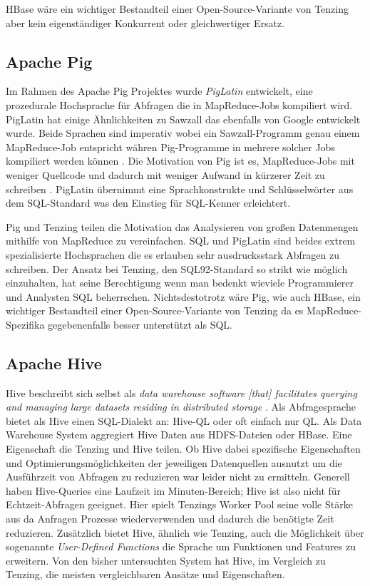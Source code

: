\documentclass[a4paper]{article}
\begin{document}
HBase wäre ein wichtiger Bestandteil einer Open-Source-Variante von Tenzing aber kein eigenständiger Konkurrent oder gleichwertiger Ersatz.

\subsection{Apache Pig}
Im Rahmen des Apache Pig Projektes wurde \textit{PigLatin} entwickelt, eine prozedurale Hochsprache für Abfragen die in MapReduce-Jobs kompiliert wird. PigLatin hat einige Ähnlichkeiten zu Sawzall \cite{Sawzall} das ebenfalls von Google entwickelt wurde. Beide Sprachen sind imperativ wobei ein Sawzall-Programm genau einem MapReduce-Job entspricht währen Pig-Programme in mehrere solcher Jobs kompiliert werden können \cite{PigWiki}. Die Motivation von Pig ist es, MapReduce-Jobs mit weniger Quellcode und dadurch mit weniger Aufwand in kürzerer Zeit zu schreiben \cite{pdfcast}. PigLatin übernimmt eine Sprachkonstrukte und Schlüsselwörter aus dem SQL-Standard was den Einstieg für SQL-Kenner erleichtert.

Pig und Tenzing teilen die Motivation das Analysieren von großen Datenmengen mithilfe von MapReduce zu vereinfachen. SQL und PigLatin sind beides extrem spezialisierte Hochsprachen die es erlauben sehr ausdrucksstark Abfragen zu schreiben. Der Ansatz bei Tenzing, den SQL92-Standard so strikt wie möglich einzuhalten, hat seine Berechtigung wenn man bedenkt wieviele Programmierer und Analysten SQL beherrschen. Nichtsdestotrotz wäre Pig, wie auch HBase, ein wichtiger Bestandteil einer Open-Source-Variante von Tenzing da es MapReduce-Spezifika gegebenenfalls besser unterstützt als SQL.

\subsection{Apache Hive}
Hive beschreibt sich selbst als \textit{data warehouse software [that] facilitates querying and managing large datasets residing in distributed storage} \cite{HiveWiki}. Als Abfragesprache bietet als Hive einen SQL-Dialekt an: Hive-QL oder oft einfach nur QL. Als Data Warehouse System aggregiert Hive Daten aus HDFS-Dateien oder HBase. Eine Eigenschaft die Tenzing und Hive teilen. Ob Hive dabei spezifische Eigenschaften und Optimierungsmöglichkeiten der jeweiligen Datenquellen ausnutzt um die Ausführzeit von Abfragen zu reduzieren war leider nicht zu ermitteln. Generell haben Hive-Queries eine Laufzeit im Minuten-Bereich; Hive ist also nicht für Echtzeit-Abfragen geeignet. Hier spielt Tenzings Worker Pool seine volle Stärke aus da Anfragen Prozesse wiederverwenden und dadurch die benötigte Zeit reduzieren. Zusätzlich bietet Hive, ähnlich wie Tenzing, auch die Möglichkeit über sogenannte \textit{User-Defined Functions} die Sprache um Funktionen und Features zu erweitern. Von den bisher untersuchten System hat Hive, im Vergleich zu Tenzing, die meisten vergleichbaren Ansätze und Eigenschaften. 
\end{document}
